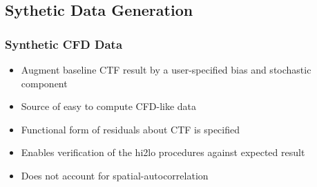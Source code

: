 \documentclass[t, pdftex]{beamer}
\begin{document}
\subsection*{Sythetic Data Generation}
\begin{frame}
\frametitle{Synthetic CFD Data}
\begin{itemize}
    \item Augment baseline CTF result by a user-specified bias and stochastic component
    \item Source of easy to compute CFD-like data
    \item Functional form of residuals about CTF is specified
    \item Enables verification of the hi2lo procedures against expected result
    \item Does not account for spatial-autocorrelation
\end{itemize}
\end{frame}
\end{document}
